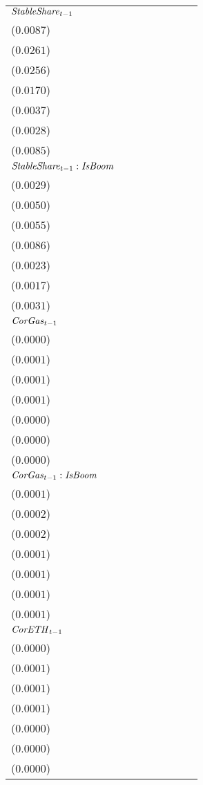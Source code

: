 \begin{tabular}{llllllll}
${\it StableShare}_{t-1}$ & \makecell{$0.0537^{***}$ \\ ($0.0087$)} & \makecell{$0.1377^{***}$ \\ ($0.0261$)} & \makecell{$0.1449^{***}$ \\ ($0.0256$)} & \makecell{$0.1135^{***}$ \\ ($0.0170$)} & \makecell{$-0.0014^{}$ \\ ($0.0037$)} & \makecell{$-0.0067^{**}$ \\ ($0.0028$)} & \makecell{$0.0576^{***}$ \\ ($0.0085$)} \\
${\it StableShare}_{t-1}:{\it IsBoom}$ & \makecell{$-0.0140^{***}$ \\ ($0.0029$)} & \makecell{$-0.0118^{**}$ \\ ($0.0050$)} & \makecell{$-0.0162^{***}$ \\ ($0.0055$)} & \makecell{$-0.0559^{***}$ \\ ($0.0086$)} & \makecell{$-0.0088^{***}$ \\ ($0.0023$)} & \makecell{$-0.0035^{**}$ \\ ($0.0017$)} & \makecell{$-0.0172^{***}$ \\ ($0.0031$)} \\
${\it CorGas}_{t-1}$ & \makecell{$-0.0000^{}$ \\ ($0.0000$)} & \makecell{$-0.0001^{}$ \\ ($0.0001$)} & \makecell{$-0.0001^{}$ \\ ($0.0001$)} & \makecell{$0.0000^{}$ \\ ($0.0001$)} & \makecell{$0.0000^{}$ \\ ($0.0000$)} & \makecell{$0.0000^{}$ \\ ($0.0000$)} & \makecell{$-0.0000^{}$ \\ ($0.0000$)} \\
${\it CorGas}_{t-1}:{\it IsBoom}$ & \makecell{$-0.0001^{}$ \\ ($0.0001$)} & \makecell{$-0.0003^{**}$ \\ ($0.0002$)} & \makecell{$-0.0005^{***}$ \\ ($0.0002$)} & \makecell{$0.0002^{}$ \\ ($0.0001$)} & \makecell{$-0.0001^{}$ \\ ($0.0001$)} & \makecell{$-0.0001^{}$ \\ ($0.0001$)} & \makecell{$-0.0000^{}$ \\ ($0.0001$)} \\
${\it CorETH}_{t-1}$ & \makecell{$0.0000^{}$ \\ ($0.0000$)} & \makecell{$0.0001^{}$ \\ ($0.0001$)} & \makecell{$0.0001^{}$ \\ ($0.0001$)} & \makecell{$0.0001^{}$ \\ ($0.0001$)} & \makecell{$0.0000^{}$ \\ ($0.0000$)} & \makecell{$0.0000^{}$ \\ ($0.0000$)} & \makecell{$0.0000^{}$ \\ ($0.0000$)} \\

\end{tabular}
